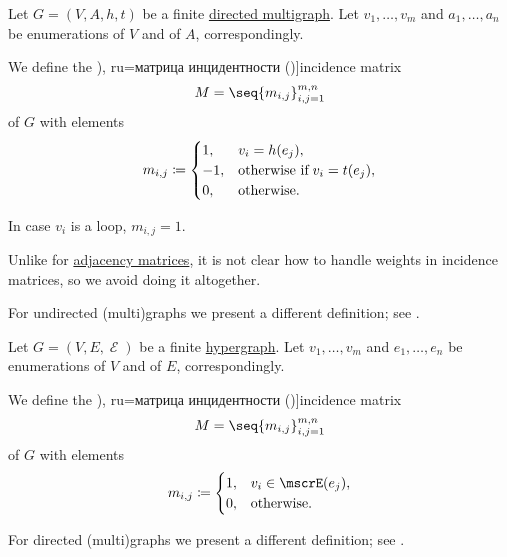 \begin{definition}\label{def:directed_incidence_matrix}
  Let \( G = (V, A, h, t) \) be a finite \hyperref[def:directed_multigraph]{directed multigraph}. Let \( v_1, \ldots, v_m \) and \( a_1, \ldots, a_n \) be enumerations of \( V \) and of \( A \), correspondingly.

  We define the \term[bg=матрица на инцидентност (\cite[47]{Мирчев2001}), ru=матрица инцидентности (\cite[289]{БелоусовТкачёв2004})]{incidence matrix}
  \begin{equation*}
    M = \seq{ m_{i,j} }_{i,j=1}^{m,n}
  \end{equation*}
  of \( G \) with elements
  \begin{equation*}
    m_{i,j} \coloneqq \begin{cases}
      1,  &v_i = h(e_j), \\
      -1, &\T{otherwise if} v_i = t(e_j), \\
      0,  &\T{otherwise.}
    \end{cases}
  \end{equation*}

  In case \( v_i \) is a loop, \( m_{i,j} = 1 \).
\end{definition}
\begin{comments}
  \item Unlike for \hyperref[def:graph_adjacency_matrix]{adjacency matrices}, it is not clear how to handle weights in incidence matrices, so we avoid doing it altogether.
  \item For undirected (multi)graphs we present a different definition; see .
\end{comments}

\begin{definition}\label{def:undirected_incidence_matrix}
  Let \( G = (V, E, \mscrE) \) be a finite \hyperref[def:hypergraph]{hypergraph}. Let \( v_1, \ldots, v_m \) and \( e_1, \ldots, e_n \) be enumerations of \( V \) and of \( E \), correspondingly.

  We define the \term[bg=матрица на инцидентност (\cite[47]{Мирчев2001}), ru=матрица инцидентности (\cite[288]{БелоусовТкачёв2004})]{incidence matrix}
  \begin{equation*}
    M = \seq{ m_{i,j} }_{i,j=1}^{m,n}
  \end{equation*}
  of \( G \) with elements
  \begin{equation*}
    m_{i,j} \coloneqq \begin{cases}
      1,  &v_i \in \mscrE(e_j), \\
      0,  &\T{otherwise.}
    \end{cases}
  \end{equation*}
\end{definition}
\begin{comments}
  \item For directed (multi)graphs we present a different definition; see .
\end{comments}

